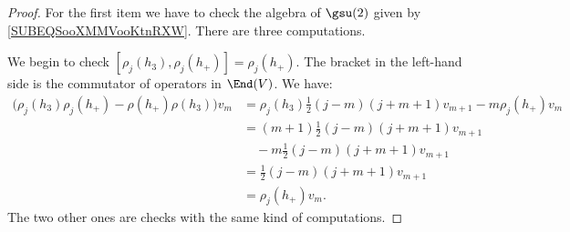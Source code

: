 \begin{proof}
    For the first item we have to check the algebra of \( \gsu(2)\) given by \eqref{SUBEQSooXMMVooKtnRXW}. There are three computations.

    We begin to check \( [\rho_j(h_3), \rho_j(h_+)]=\rho_j(h_+)\). The bracket in the left-hand side is the commutator of operators in \( \End(V)\). We have:
    \begin{subequations}
        \begin{align}
            \big( \rho_j(h_3)\rho_j(h_+)-\rho(h_+)\rho(h_3) \big)v_m&=\rho_j(h_3)\frac{ 1 }{2}(j-m)(j+m+1)v_{m+1}-m\rho_j(h_+)v_m\\
            &=(m+1)\frac{ 1 }{2}(j-m)(j+m+1)v_{m+1}\\
                &\quad-m\frac{ 1 }{2}(j-m)(j+m+1)v_{m+1}\\
            &=\frac{ 1 }{2}(j-m)(j+m+1)v_{m+1}\\
            &=\rho_j(h_+)v_m.
        \end{align}
    \end{subequations}
    The two other ones are checks with the same kind of computations.


\end{proof}

